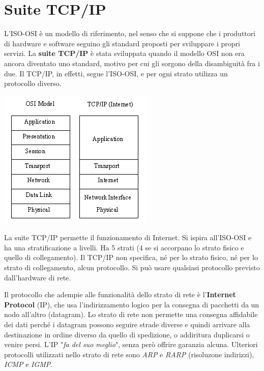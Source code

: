 \section{Suite TCP/IP}

L'ISO-OSI è un modello di riferimento, nel senso che si suppone che i produttori di hardware e software seguino gli standard proposti per sviluppare i propri servizi. La \textbf{suite TCP/IP} è stata sviluppata quando il modello OSI non era ancora diventato uno standard, motivo per cui gli sorgono della disambiguità fra i due. Il TCP/IP, in effetti, segue l'ISO-OSI, e per ogni strato utilizza un protocollo diverso.

\begin{center}
    \includegraphics{images/TCP.png}
\end{center}

La suite TCP/IP permette il funzionamento di Internet. Si ispira all'ISO-OSI e ha una stratificazione a livelli. Ha 5 strati (4 se si accorpano lo strato fisico e quello di collegamento). Il TCP/IP non specifica, né per lo strato fisico, né per lo strato di collegamento, alcun protocollo. Si può usare qualsiasi protocollo previsto dall'hardware di rete. 

\vspace{3mm}

Il protocollo che adempie alle funzionalità dello strato di rete è l'\textbf{Internet Protocol} (IP), che usa l'indirizzamento logico per la consegna di pacchetti da un nodo all'altro (datagram). Lo strato di rete non permette una consegna affidabile dei dati perché i datagram possono seguire strade diverse e quindi arrivare alla destinazione in ordine diverso da quello di spedizione, o addiritura duplicarsi o venire persi. 
L'IP "\textit{fa del suo meglio}", senza però offrire garanzia alcuna. Ulteriori protocolli utilizzati nello strato di rete sono \textit{ARP} e \textit{RARP} (risoluzone indirizzi), \textit{ICMP} e \textit{IGMP}.

